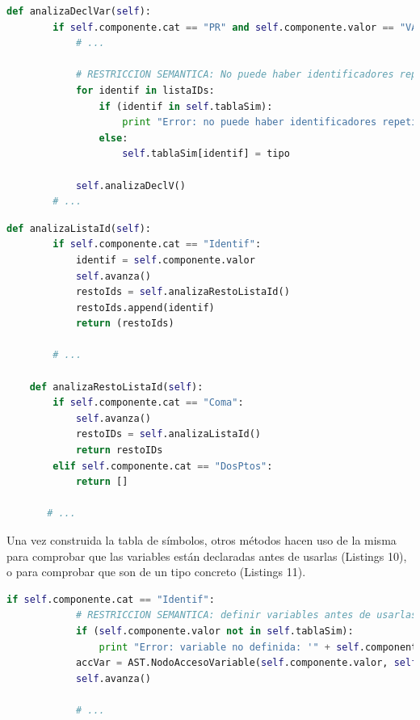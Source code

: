 \documentclass[11pt]{article}
\begin{document}
\begin{minipage}{\linewidth}
	\begin{lstlisting}[language=Python, caption=analizaDeclVar()]
	def analizaDeclVar(self):
        if self.componente.cat == "PR" and self.componente.valor == "VAR":
            # ...

            # RESTRICCION SEMANTICA: No puede haber identificadores repetidos
            for identif in listaIDs:
                if (identif in self.tablaSim):
                    print "Error: no puede haber identificadores repetidos. ID repetido: " + str(identif)
                else:
                    self.tablaSim[identif] = tipo

            self.analizaDeclV()
        # ...
	\end{lstlisting}
\end{minipage}

\begin{minipage}{\linewidth}

	\begin{lstlisting}[language=Python, caption=analizaListaId() y analizaRestoListaId()]
	def analizaListaId(self):
        if self.componente.cat == "Identif":
            identif = self.componente.valor
            self.avanza()
            restoIds = self.analizaRestoListaId()
            restoIds.append(identif)
            return (restoIds)
        
        # ...
    
    def analizaRestoListaId(self):
        if self.componente.cat == "Coma":
            self.avanza()
            restoIDs = self.analizaListaId()
            return restoIDs
        elif self.componente.cat == "DosPtos":
            return []
       
       # ...
     \end{lstlisting}
\end{minipage}
\newpage

Una vez construida la tabla de símbolos, otros métodos hacen uso de la misma para comprobar que las variables están declaradas antes de usarlas (Listings 10), o para comprobar que son de un tipo concreto (Listings 11).

\begin{minipage}{\linewidth}

\begin{lstlisting}[language=Python, caption=analizaInstSimple()]
        if self.componente.cat == "Identif":
		    # RESTRICCION SEMANTICA: definir variables antes de usarlas
            if (self.componente.valor not in self.tablaSim):
                print "Error: variable no definida: '" + self.componente.valor + "' en linea " + str(self.componente.linea)
            accVar = AST.NodoAccesoVariable(self.componente.valor, self.lexico.nlinea, self.tablaSim[self.componente.valor])
            self.avanza()
            
            # ...
    \end{lstlisting}
\end{minipage}
\end{document}
